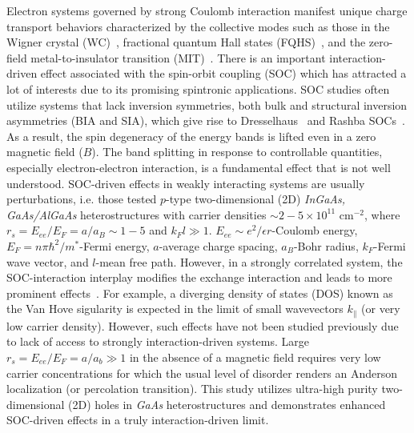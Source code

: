 \documentclass[twocolumn,secnumarabic,amssymb, nobibnotes, aps, prd]{revtex4-1}
\begin{document}

Electron systems governed by strong Coulomb interaction manifest unique charge transport behaviors characterized by the collective modes such as those in the Wigner crystal (WC)~\cite{wc}, fractional quantum Hall states (FQHS)~\cite{tsui82}, and the zero-field metal-to-insulator transition (MIT)~\cite{mit}. There is an important interaction-driven effect associated with the spin-orbit coupling (SOC) which has attracted a lot of interests due to its promising spintronic applications. SOC studies often utilize systems that lack inversion symmetries, both bulk and structural inversion asymmetries (BIA and SIA), which give rise to Dresselhaus~\cite{dresselhaus} and  Rashba SOCs~\cite{rashba}. As a result, the spin degeneracy of the energy bands is lifted even in a zero magnetic field ($B$). The band splitting in response to controllable quantities, especially electron-electron interaction, is a fundamental effect that is not well understood. SOC-driven effects in weakly interacting systems are usually perturbations, i.e. those tested $p$-type two-dimensional (2D) {\it InGaAs, GaAs/AlGaAs} heterostructures with carrier densities $\sim2-5\times10^{11}$ cm$^{-2}$, where $r_s=E_{ee}/E_F=a/a_B\sim1-5$ and $k_F l\gg1$. $E_{ee}\sim e^2/\epsilon r$-Coulomb energy, $E_F=n\pi\hbar^2/m^*$-Fermi energy, $a$-average charge spacing, $a_B$-Bohr radius, $k_F$-Fermi wave vector, and $l$-mean free path. However, in a strongly correlated system, the SOC-interaction interplay modifies the exchange interaction and leads to more prominent effects~\cite{Altshuler,pudalovSOC,Giuliani}. For example, a diverging density of states (DOS) known as the Van Hove sigularity is expected in the limit of small wavevectors $k_{\parallel}$ (or very low carrier density). However, such effects have not been studied previously due to lack of access to strongly interaction-driven systems. Large $r_s=E_{ee}/E_F=a/a_b\gg 1$ in the absence of a magnetic field requires very low carrier concentrations for which the usual level of disorder renders an Anderson localization (or percolation transition). This study utilizes ultra-high purity two-dimensional (2D) holes in {\it GaAs} heterostructures and demonstrates enhanced SOC-driven effects in a truly interaction-driven limit.
\end{document}
